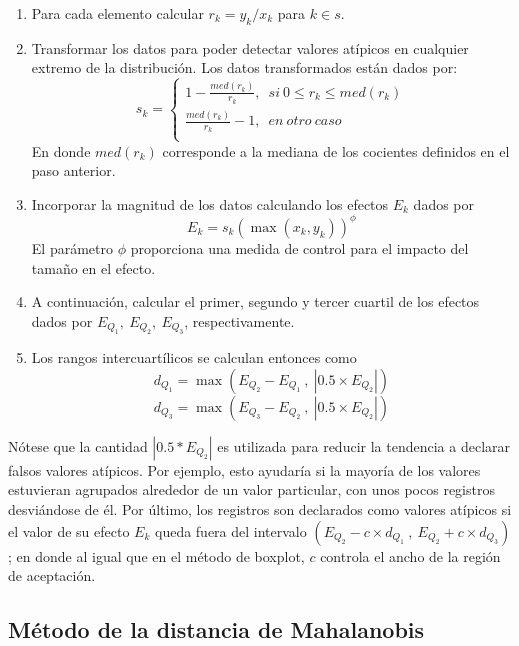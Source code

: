 \documentclass[
  12pt,
  spanish,
]{book}
\providecommand{\tightlist}{%
  \setlength{\itemsep}{0pt}\setlength{\parskip}{0pt}}
\begin{document}
\begin{enumerate}
\def\labelenumi{\arabic{enumi}.}
\tightlist
\item
  Para cada elemento calcular \(r_k=y_k/x_k\) para \(k\in s\).
\item
  Transformar los datos para poder detectar valores atípicos en cualquier extremo de la distribución. Los datos transformados están dados por:
  \[s_k=\left\{\begin{matrix}1-\frac{med(r_k)}{r_k},\;\ si\ 0\le r_k\le m e d(r_k)\\\frac{med(r_k)}{r_k}-1,\;\ en \ otro \ caso\\\end{matrix}\right.\] En donde \(med(r_k)\) corresponde a la mediana de los cocientes definidos en el paso anterior.\\
\item
  Incorporar la magnitud de los datos calculando los efectos \(E_k\) dados por
  \[
  E_k = s_k  \left( \max(x_k,y_k) \right)^\phi
  \]
  El parámetro \(\phi\) proporciona una medida de control para el impacto del tamaño en el efecto.
\item
  A continuación, calcular el primer, segundo y tercer cuartil de los efectos dados por \(E_{Q_1}, \ E_{Q_2}, \ E_{Q_3}\), respectivamente.
\item
  Los rangos intercuartílicos se calculan entonces como
  \[
  d_{Q_1} = \max\left(E_{Q_2} - E_{Q_1}\ , \ |0.5 \times E_{Q_2}|\right)
  \]
  \[
  d_{Q_3} = \max\left(E_{Q_3} - E_{Q_2}\ , \ |0.5 \times E_{Q_2}|\right) 
  \]
\end{enumerate}

Nótese que la cantidad \(|0.5*E_{Q_2}|\) es utilizada para reducir la tendencia a declarar falsos valores atípicos. Por ejemplo, esto ayudaría si la mayoría de los valores estuvieran agrupados alrededor de un valor particular, con unos pocos registros desviándose de él. Por último, los registros son declarados como valores atípicos si el valor de su efecto \(E_k\) queda fuera del intervalo \((E_{Q_2} - c \times d_{Q_1} \ , \ E_{Q_2} + c \times d_{Q_3})\); en donde al igual que en el método de boxplot, \(c\) controla el ancho de la región de aceptación.

\hypertarget{muxe9todo-de-la-distancia-de-mahalanobis}{%
\subsection{Método de la distancia de Mahalanobis}\label{muxe9todo-de-la-distancia-de-mahalanobis}}
\end{document}
